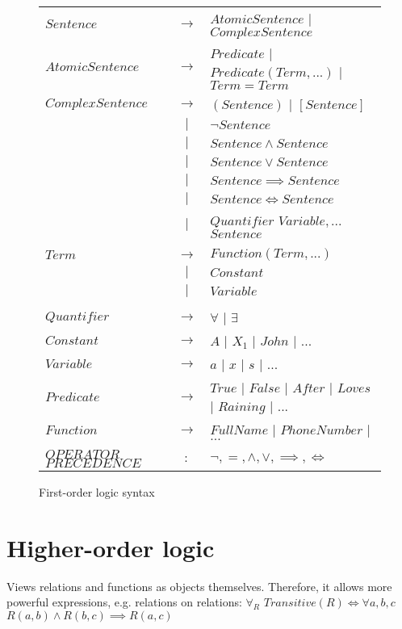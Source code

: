 \documentclass{report}
\begin{document}
\begin{figure}[h!]
\centering
\begin{tabular}{lcl}
$Sentence$ & $\rightarrow$ & $AtomicSentence$ $\vert$ $ComplexSentence$ \\
$AtomicSentence$ & $\rightarrow$ & $Predicate$ $\vert$ $Predicate(Term,...)$ $\vert$ $Term=Term$ \\
$ComplexSentence$ & $\rightarrow$ & $(Sentence)$ $\vert$ $[Sentence]$ \\
 & $\vert$ & $\neg Sentence$ \\
 & $\vert$ & $Sentence \wedge Sentence$ \\
 & $\vert$ & $Sentence \vee Sentence$ \\
 & $\vert$ & $Sentence \implies Sentence$ \\
 & $\vert$ & $Sentence \iff Sentence$ \\
 & $\vert$ & $Quantifier$ $Variable, ...$ $Sentence$ \\
\\
$Term$ & $\rightarrow$ & $Function(Term,...)$ \\
 & $\vert$ & $Constant$ \\
 & $\vert$ & $Variable$ \\
 \\
$Quantifier$ & $\rightarrow$ & $\forall$ $\vert$ $\exists$ \\
$Constant$ & $\rightarrow$ & $A$ $\vert$ $X_1$ $\vert$ $John$ $\vert$ $...$ \\
$Variable$ & $\rightarrow$ & $a$ $\vert$ $x$ $\vert$ $s$ $\vert$ $...$ \\
$Predicate$ & $\rightarrow$ & $True$ $\vert$ $False$ $\vert$ $After$ $\vert$ $Loves$ $\vert$ $Raining$ $\vert$ $...$\\
$Function$ & $\rightarrow$ & $FullName$ $\vert$ $PhoneNumber$ $\vert$ $...$ \\
\\
$OPERATOR$ $PRECEDENCE$ & $:$ & $\neg,=,\wedge,\vee,\implies,\iff$ \\
\end{tabular}
\caption{First-order logic syntax}
\label{ref:firstordersyntax}
\end{figure}



\section{Higher-order logic}
Views relations and functions as objects themselves. Therefore, it allows more powerful expressions, e.g. relations on relations: $\forall_R$ $Transitive(R)\iff \forall a,b,c$ $R(a,b)\wedge R(b,c) \implies R(a,c)$
\end{document}
